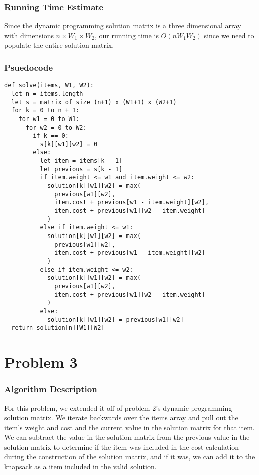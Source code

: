 \documentclass{math}
\begin{document}
\subsubsection*{Running Time Estimate}
Since the dynamic programming solution matrix is a three dimensional array with
dimensions \( n\times W_1\times W_2 \), our running time is \( O(nW_1W_2) \)
since we need to populate the entire solution matrix.

\subsubsection*{Psuedocode}
\begin{lstlisting}
def solve(items, W1, W2):
  let n = items.length
  let s = matrix of size (n+1) x (W1+1) x (W2+1)
  for k = 0 to n + 1:
    for w1 = 0 to W1:
      for w2 = 0 to W2:
        if k == 0:
          s[k][w1][w2] = 0
        else:
          let item = items[k - 1]
          let previous = s[k - 1]
          if item.weight <= w1 and item.weight <= w2:
            solution[k][w1][w2] = max(
              previous[w1][w2],
              item.cost + previous[w1 - item.weight][w2],
              item.cost + previous[w1][w2 - item.weight]
            )
          else if item.weight <= w1:
            solution[k][w1][w2] = max(
              previous[w1][w2],
              item.cost + previous[w1 - item.weight][w2]
            )
          else if item.weight <= w2:
            solution[k][w1][w2] = max(
              previous[w1][w2],
              item.cost + previous[w1][w2 - item.weight]
            )
          else:
            solution[k][w1][w2] = previous[w1][w2]
  return solution[n][W1][W2]
\end{lstlisting}

\section*{Problem 3}

\subsubsection*{Algorithm Description}
For this problem, we extended it off of problem 2's dynamic programming solution
matrix. We iterate backwards over the items array and pull out the item's
weight and cost and the current value in the solution matrix for that item. We
can subtract the value in the solution matrix from the previous value in the
solution matrix to determine if the item was included in the cost calculation
during the construction of the solution matrix, and if it was, we can add it to
the knapsack as a item included in the valid solution.
\end{document}
